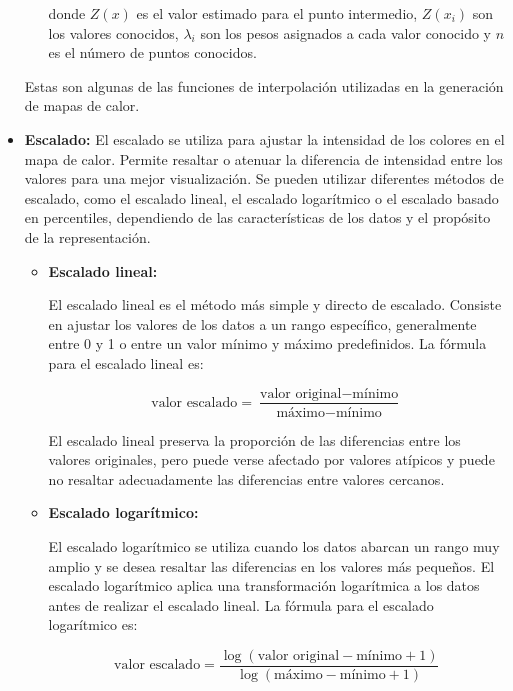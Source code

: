 \documentclass{article}
\begin{document}
\begin{itemize}
\begin{itemize}
donde $Z(x)$ es el valor estimado para el punto intermedio, $Z(x_i)$ son los valores conocidos, $\lambda_i$ son los pesos asignados a cada valor conocido y $n$ es el número de puntos conocidos.
\end{itemize}

Estas son algunas de las funciones de interpolación utilizadas en la generación de mapas de calor.
\item\textbf{Escalado: } El escalado se utiliza para ajustar la intensidad de los colores en el mapa de calor. Permite resaltar o atenuar la diferencia de intensidad entre los valores para una mejor visualización. Se pueden utilizar diferentes métodos de escalado, como el escalado lineal, el escalado logarítmico o el escalado basado en percentiles, dependiendo de las características de los datos y el propósito de la representación.

\begin{itemize}
\item   \textbf{Escalado lineal:}

El escalado lineal es el método más simple y directo de escalado. Consiste en ajustar los valores de los datos a un rango específico, generalmente entre 0 y 1 o entre un valor mínimo y máximo predefinidos. La fórmula para el escalado lineal es:

\begin{equation}
    \textrm{valor escalado} = \frac{\textrm{valor original} - \textrm{mínimo}}{\textrm{máximo} - \textrm{mínimo}}
\end{equation}

El escalado lineal preserva la proporción de las diferencias entre los valores originales, pero puede verse afectado por valores atípicos y puede no resaltar adecuadamente las diferencias entre valores cercanos.

\item   \textbf{Escalado logarítmico:}

El escalado logarítmico se utiliza cuando los datos abarcan un rango muy amplio y se desea resaltar las diferencias en los valores más pequeños. El escalado logarítmico aplica una transformación logarítmica a los datos antes de realizar el escalado lineal. La fórmula para el escalado logarítmico es:

\begin{equation}
    \textrm{valor escalado} = \frac{\log(\textrm{valor original} - \textrm{mínimo} + 1)}{\log(\textrm{máximo} - \textrm{mínimo} + 1)}
\end{equation}


\end{itemize}
\end{itemize}
\end{document}
